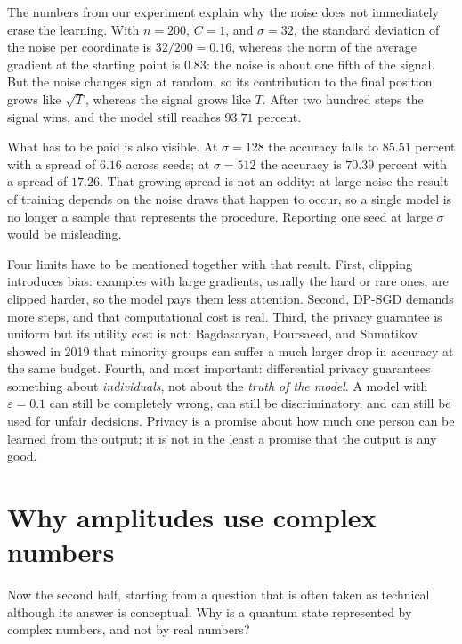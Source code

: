 The numbers from our experiment explain why the noise does not immediately erase the
learning. With $n=200$, $C=1$, and $\sigma=32$, the standard deviation of the noise per
coordinate is $32/200=0.16$, whereas the norm of the average gradient at the starting
point is $0.83$: the noise is about one fifth of the signal. But the noise changes sign
at random, so its contribution to the final position grows like $\sqrt{T}$, whereas the
signal grows like $T$. After two hundred steps the signal wins, and the model still
reaches $93.71$ percent.

What has to be paid is also visible. At $\sigma=128$ the accuracy falls to $85.51$
percent with a spread of $6.16$ across seeds; at $\sigma=512$ the accuracy is $70.39$
percent with a spread of $17.26$. That growing spread is not an oddity: at large noise
the result of training depends on the noise draws that happen to occur, so a single model
is no longer a sample that represents the procedure. Reporting one seed at large $\sigma$
would be misleading.

Four limits have to be mentioned together with that result. First, clipping introduces
bias: examples with large gradients, usually the hard or rare ones, are clipped harder, so
the model pays them less attention. Second, DP-SGD demands more steps, and that
computational cost is real. Third, the privacy guarantee is uniform but its utility cost
is not: Bagdasaryan, Poursaeed, and Shmatikov showed in 2019 that minority groups can
suffer a much larger drop in accuracy at the same budget. Fourth, and most important:
differential privacy guarantees something about \emph{individuals}, not about the
\emph{truth of the model}. A model with $\varepsilon=0.1$ can still be completely wrong,
can still be discriminatory, and can still be used for unfair decisions. Privacy is a
promise about how much one person can be learned from the output; it is not in the least a
promise that the output is any good.


\section{Why amplitudes use complex numbers}

Now the second half, starting from a question that is often taken as technical although
its answer is conceptual. Why is a quantum state represented by complex numbers, and not
by real numbers?

